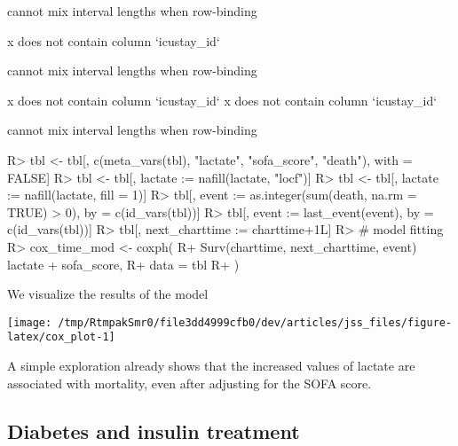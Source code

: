 \documentclass[
]{jss}
\begin{document}
\begin{CodeChunk}
\begin{CodeOutput}
cannot mix interval lengths when row-binding
\end{CodeOutput}

\begin{CodeOutput}
x does not contain column `icustay_id`
\end{CodeOutput}

\begin{CodeOutput}
cannot mix interval lengths when row-binding
\end{CodeOutput}

\begin{CodeOutput}
x does not contain column `icustay_id`
x does not contain column `icustay_id`
\end{CodeOutput}

\begin{CodeOutput}
cannot mix interval lengths when row-binding
\end{CodeOutput}

\begin{CodeInput}
R> tbl <- tbl[, c(meta_vars(tbl), "lactate", "sofa_score", "death"), with = FALSE]
R> tbl <- tbl[, lactate := nafill(lactate, "locf")]
R> tbl <- tbl[, lactate := nafill(lactate, fill = 1)]
R> tbl[, event := as.integer(sum(death, na.rm = TRUE) > 0), by = c(id_vars(tbl))]
R> tbl[, event := last_event(event), by = c(id_vars(tbl))]
R> tbl[, next_charttime := charttime+1L]
R> # model fitting
R> cox_time_mod <- coxph(
R+   Surv(charttime, next_charttime, event) ~ lactate + sofa_score,
R+   data = tbl
R+ )
\end{CodeInput}
\end{CodeChunk}

We visualize the results of the model

\begin{CodeChunk}


\begin{center}\texttt{[image: /tmp/RtmpakSmr0/file3dd4999cfb0/dev/articles/jss\_files/figure-latex/cox\_plot-1]} \end{center}

\end{CodeChunk}

A simple exploration already shows that the increased values of lactate
are associated with mortality, even after adjusting for the SOFA score.

\hypertarget{diabetes-and-insulin-treatment}{%
\subsection{Diabetes and insulin
treatment}\label{diabetes-and-insulin-treatment}}
\end{document}

